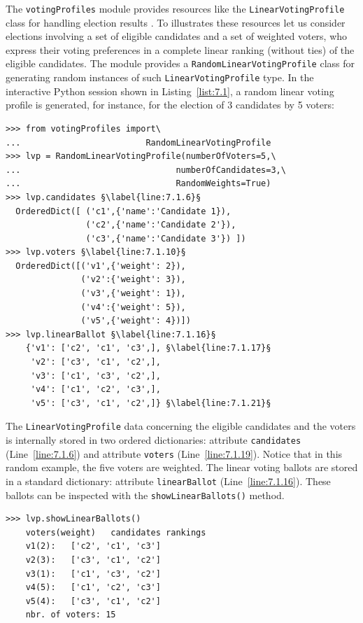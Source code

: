 The \texttt{votingProfiles} module provides resources like the \texttt{LinearVoting\-Profile} class for handling election results \citep{ADT-L2}. To illustrates these resources let us consider elections involving a set of eligible candidates and a set of weighted voters, who express their voting preferences in a complete linear ranking (without ties) of the eligible candidates. The module provides a \texttt{RandomLinear\-VotingProfile} class  for generating random instances of such \texttt{LinearVot\-ingProfile} type. In the interactive Python session shown in Listing~\vref{list:7.1}, a random linear voting profile is generated, for instance, for the election of 3 candidates by 5 voters:
\begin{lstlisting}[caption={Example of random linear voting profile},label=list:7.1]
>>> from votingProfiles import\
...                         RandomLinearVotingProfile
>>> lvp = RandomLinearVotingProfile(numberOfVoters=5,\
...                               numberOfCandidates=3,\
...                               RandomWeights=True) 
>>> lvp.candidates §\label{line:7.1.6}§
  OrderedDict([ ('c1',{'name':'Candidate 1}),
                ('c2',{'name':'Candidate 2'}),
                ('c3',{'name':'Candidate 3'}) ])
>>> lvp.voters §\label{line:7.1.10}§
  OrderedDict([('v1',{'weight': 2}),
               ('v2':{'weight': 3}), 
               ('v3',{'weight': 1}),
               ('v4':{'weight': 5}),
               ('v5',{'weight': 4})])
>>> lvp.linearBallot §\label{line:7.1.16}§
    {'v1': ['c2', 'c1', 'c3',], §\label{line:7.1.17}§
     'v2': ['c3', 'c1', 'c2',],
     'v3': ['c1', 'c3', 'c2',],
     'v4': ['c1', 'c2', 'c3',],
     'v5': ['c3', 'c1', 'c2',]} §\label{line:7.1.21}§
 \end{lstlisting}

The \texttt{LinearVotingProfile} data concerning the eligible candidates and the voters is internally stored in two ordered dictionaries: attribute \texttt{candidates} (Line~\ref{line:7.1.6}) and attribute \texttt{voters} (Line~\ref{line:7.1.19}). Notice that in this random example, the five voters are weighted. The linear voting ballots are stored in a standard dictionary: attribute \texttt{linearBallot} (Line~\ref{line:7.1.16}). These ballots can be inspected with the \texttt{showLinearBallots()} method.
\begin{lstlisting}[caption={Showing linear voting profiles},label=list:7.2]
>>> lvp.showLinearBallots()
    voters(weight)	 candidates rankings
    v1(2): 	 ['c2', 'c1', 'c3']
    v2(3): 	 ['c3', 'c1', 'c2']
    v3(1): 	 ['c1', 'c3', 'c2']
    v4(5): 	 ['c1', 'c2', 'c3']
    v5(4): 	 ['c3', 'c1', 'c2']
    nbr. of voters: 15
\end{lstlisting}


